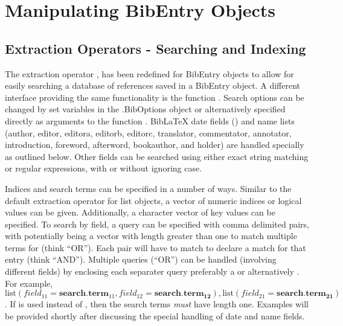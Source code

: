 \documentclass[article]{jss}\usepackage[]{graphicx}\usepackage[]{color}
\begin{document}
\section{Manipulating BibEntry Objects}
\subsection{Extraction Operators - Searching and Indexing}\label{searchsec}
The extraction operator \code{'['}, has been redefined for BibEntry objects to allow for easily searching a database of references saved in a BibEntry object.  A different interface providing the same functionality is the function .  Search options can be changed by set variables in the .BibOptions object or alternatively specified directly as arguments to the function .  BibLaTeX date fields () and name lists (author, editor, editora, editorb, editorc, translator, commentator, annotator, introduction, foreword, afterword, bookauthor, and holder) are handled specially as outlined below.  Other fields can be searched using either exact string matching or regular expressions, with or without ignoring case.

Indices and search terms can be specified in a number of ways.  Similar to the default extraction operator for list objects, a vector of numeric indices or logical values can be given.  Additionally, a character vector of key values can be specified.  To search by field, a query can be specified with comma delimited  pairs, with  potentially being a vector with length greater than one to match multiple terms for  (think ``OR'').  Each  pair will have to match to declare a match for that entry (think ``AND'').  Multiple queries (``OR'') can be handled (involving different fields) by enclosing each separater query preferably a  or alternatively .  For example, $\text{list}(field_{11} = \mathbf{search.term}_{11},field_{12}=\mathbf{search.term_{12}}),\text{list}(field_{21}=\mathbf{search.term_{21}})$.  If  is used instead of , then the search terms \emph{must} have length one.  Examples will be provided shortly after discussing the special handling of date and name fields.  
\end{document}
